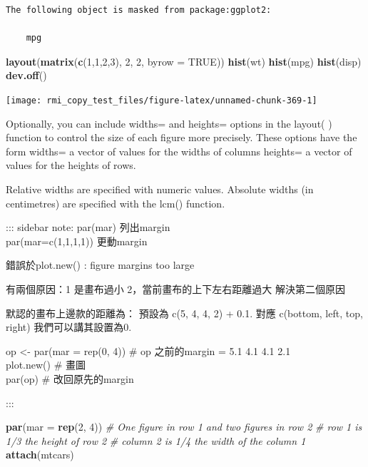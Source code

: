 \documentclass[]{book}
\newenvironment{Shaded}{\begin{snugshade}}{\end{snugshade}}
\newcommand{\KeywordTok}[1]{\textcolor[rgb]{0.13,0.29,0.53}{\textbf{#1}}}
\newcommand{\DataTypeTok}[1]{\textcolor[rgb]{0.13,0.29,0.53}{#1}}
\newcommand{\DecValTok}[1]{\textcolor[rgb]{0.00,0.00,0.81}{#1}}
\newcommand{\CommentTok}[1]{\textcolor[rgb]{0.56,0.35,0.01}{\textit{#1}}}
\newcommand{\OtherTok}[1]{\textcolor[rgb]{0.56,0.35,0.01}{#1}}
\newcommand{\NormalTok}[1]{#1}
\theoremstyle{definition}
\theoremstyle{definition}
\theoremstyle{definition}
\theoremstyle{remark}
\begin{document}
\begin{verbatim}
The following object is masked from package:ggplot2:

    mpg
\end{verbatim}

\begin{Shaded}
\begin{Highlighting}[]
\KeywordTok{layout}\NormalTok{(}\KeywordTok{matrix}\NormalTok{(}\KeywordTok{c}\NormalTok{(}\DecValTok{1}\NormalTok{,}\DecValTok{1}\NormalTok{,}\DecValTok{2}\NormalTok{,}\DecValTok{3}\NormalTok{), }\DecValTok{2}\NormalTok{, }\DecValTok{2}\NormalTok{, }\DataTypeTok{byrow =} \OtherTok{TRUE}\NormalTok{))}
\KeywordTok{hist}\NormalTok{(wt)}
\KeywordTok{hist}\NormalTok{(mpg)}
\KeywordTok{hist}\NormalTok{(disp)}
\KeywordTok{dev.off}\NormalTok{()}
\end{Highlighting}
\end{Shaded}

\begin{center}\texttt{[image: rmi\_copy\_test\_files/figure-latex/unnamed-chunk-369-1]} \end{center}

Optionally, you can include widths= and heights= options in the layout(
) function to control the size of each figure more precisely. These
options have the form widths= a vector of values for the widths of
columns heights= a vector of values for the heights of rows.

Relative widths are specified with numeric values. Absolute widths (in
centimetres) are specified with the lcm() function.

::: sidebar note: par(mar) 列出margin\\
par(mar=c(1,1,1,1)) 更動margin

錯誤於plot.new() : figure margins too large

有兩個原因：1 是畫布過小 2，當前畫布的上下左右距離過大 解決第二個原因

默認的畫布上邊款的距離為： 預設為 c(5, 4, 4, 2) + 0.1. 對應 c(bottom,
left, top, right) 我們可以講其設置為0.

op \textless{}- par(mar = rep(0, 4)) \# op 之前的margin = 5.1 4.1 4.1
2.1\\
plot.new() \# 畫圖\\
par(op) \# 改回原先的margin

:::

\begin{Shaded}
\begin{Highlighting}[]
\KeywordTok{par}\NormalTok{(}\DataTypeTok{mar =} \KeywordTok{rep}\NormalTok{(}\DecValTok{2}\NormalTok{, }\DecValTok{4}\NormalTok{)) }
\CommentTok{# One figure in row 1 and two figures in row 2}
\CommentTok{# row 1 is 1/3 the height of row 2}
\CommentTok{# column 2 is 1/4 the width of the column 1 }
\KeywordTok{attach}\NormalTok{(mtcars)}
\end{Highlighting}
\end{Shaded}
\end{document}

